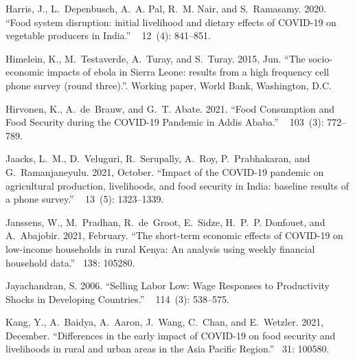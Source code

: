 \documentclass{wber}
\begin{document}
\begin{thebibliography}{}
Harris, J., L.~Depenbusch, A.~A. Pal, R.~M. Nair, and S.~Ramasamy. 2020.
\newblock ``Food system disruption: initial livelihood and dietary effects of
  {COVID}-19 on vegetable producers in {India}.''
~{ 12\/}~(4): 841--851.

Himelein, K., M.~Testaverde, A.~Turay, and S.~Turay. 2015, Jun.
\newblock ``The socio-economic impacts of ebola in {Sierra Leone}: results from
  a high frequency cell phone survey (round three).''.
\newblock Working paper, World Bank, Washington, D.C.

Hirvonen, K., A.~de~Brauw, and G.~T. Abate. 2021.
\newblock ``Food {Consumption} and {Food} {Security} during the {COVID}-19
  {Pandemic} in {Addis} {Ababa}.''
~{ 103\/}~(3):
  772--789.

Jaacks, L.~M., D.~Veluguri, R.~Serupally, A.~Roy, P.~Prabhakaran, and
  G.~Ramanjaneyulu. 2021, October.
\newblock ``Impact of the {COVID}-19 pandemic on agricultural production,
  livelihoods, and food security in {India}: baseline results of a phone
  survey.''
~{ 13\/}~(5): 1323--1339.

Janssens, W., M.~Pradhan, R.~de~Groot, E.~Sidze, H.~P.~P. Donfouet, and
  A.~Abajobir. 2021, February.
\newblock ``The short-term economic effects of {COVID}-19 on low-income
  households in rural {Kenya}: {An} analysis using weekly financial household
  data.''
~{138}: 105280.

Jayachandran, S. 2006.
\newblock ``Selling {Labor} {Low}: {Wage} {Responses} to {Productivity}
  {Shocks} in {Developing} {Countries}.''
~{ 114\/}~(3): 538--575.

Kang, Y., A.~Baidya, A.~Aaron, J.~Wang, C.~Chan, and E.~Wetzler. 2021,
  December.
\newblock ``Differences in the early impact of {COVID}-19 on food security and
  livelihoods in rural and urban areas in the {Asia} {Pacific} {Region}.''
~{31}: 100580.


\end{thebibliography}
\end{document}
